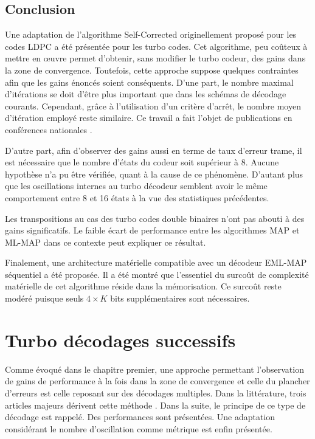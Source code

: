 \subsection{Conclusion}
Une adaptation de l'algorithme Self-Corrected originellement proposé pour les codes LDPC a été présentée pour les turbo 
codes. Cet algorithme, peu coûteux à mettre en œuvre permet d'obtenir, sans modifier le turbo codeur, des gains dans la zone 
de convergence. Toutefois, cette approche suppose quelques contraintes afin que les gains énoncés soient
 conséquents. D'une part, le nombre maximal d'itérations se doit d'être plus important que dans les schémas de 
 décodage courants. Cependant, grâce à l'utilisation d'un critère d'arrêt, le nombre moyen d'itération employé reste 
 similaire. Ce travail a fait l'objet de publications en conférences nationales .

 D'autre part, afin d'observer des gains aussi en terme de taux d'erreur trame, il est nécessaire que le 
 nombre d'états du codeur soit supérieur à 8. Aucune hypothèse n'a pu être vérifiée, quant à la cause de ce phénomène. 
 D'autant plus que les oscillations internes au 
turbo décodeur semblent avoir le même comportement entre 8 et 16 états à la vue des statistiques précédentes. 

Les transpositions au cas des turbo codes double binaires n'ont pas abouti à des gains significatifs. Le faible écart de 
performance entre les algorithmes MAP et ML-MAP dans ce contexte peut expliquer ce résultat.

Finalement, une architecture matérielle compatible avec un décodeur EML-MAP séquentiel a été proposée. Il a été montré 
que l'essentiel du surcoût de complexité matérielle de cet algorithme réside dans la mémorisation. Ce surcoût reste modéré puisque 
seuls $4\times K$ bits supplémentaires sont nécessaires.

\section{Turbo décodages successifs}
Comme évoqué dans le chapitre premier, une approche permettant l'observation de gains de performance à la fois dans la 
zone de convergence et celle du plancher d'erreurs est celle reposant sur des décodages multiples. Dans la littérature, trois 
articles majeurs dérivent cette méthode \cite{cim,fsm,pflet}. Dans la suite, le principe de ce type de décodage est rappelé. 
Des performances sont présentées. Une adaptation considérant le nombre d'oscillation comme métrique est enfin présentée.

